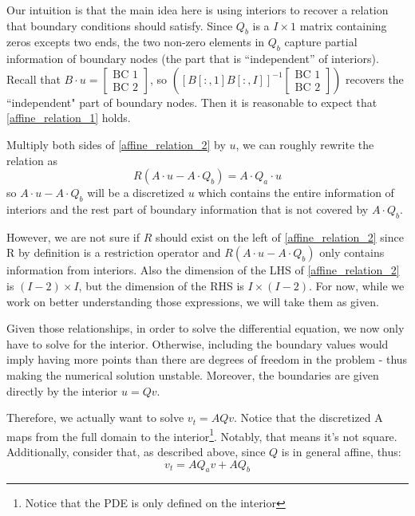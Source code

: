 \documentclass[11pt]{article}
\begin{document}
\begin{itemize}
Our intuition is that the main idea here is using interiors to recover a relation that boundary conditions should satisfy. Since $Q_b$ is a $I\times 1$ matrix containing zeros excepts two ends, the two non-zero elements in $Q_b$ capture partial information of boundary nodes (the part that is ``independent'' of interiors).  Recall that $B\cdot u =\begin{bmatrix}
\text{BC 1}\\
\text{BC 2}
\end{bmatrix} $, so $\left([B[:, 1] B[:, I]]^{-1}\begin{bmatrix}
\text{BC 1}\\
\text{BC 2}
\end{bmatrix}\right)$ recovers the ``independent" part of boundary nodes. Then it is reasonable to expect that \eqref{affine_relation_1} holds.

Multiply both sides of \eqref{affine_relation_2} by $u$, we can roughly rewrite the relation as
\begin{equation}
R(A\cdot u-A\cdot Q_b) = A\cdot Q_a\cdot u
\end{equation}
so $A\cdot u-A\cdot Q_b$ will be a discretized $u$ which contains the entire information of interiors and the rest part of boundary information that is not covered by $A\cdot Q_b$. 

However, we are not sure if $R$ should exist on the left of \eqref{affine_relation_2} since R by definition is a restriction operator and $R(A\cdot u-A\cdot Q_b)$ only contains information from interiors. Also the dimension of the LHS of \eqref{affine_relation_2} is $(I-2)\times I$, but the dimension of the RHS is $I\times (I-2)$.
For now, while we work on better understanding those expressions, we will take them as given.

Given those relationships, in order to solve the differential equation, we now only have to solve for the interior. Otherwise, including the boundary values would imply having more points than there are degrees of freedom in the problem - thus making the numerical solution unstable. Moreover, the boundaries are given directly by the interior $u = Qv$. 

Therefore, we actually want to solve $v_t = AQv$. Notice that the discretized A maps from the full domain to the interior\footnote{Notice that the PDE is only defined on the interior}. Notably, that means it's not square. Additionally, consider that, as described above, since $Q$ is in general affine, thus:
\begin{equation}
v_t = AQ_av + AQ_b
\end{equation}


\end{itemize}
\end{document}
